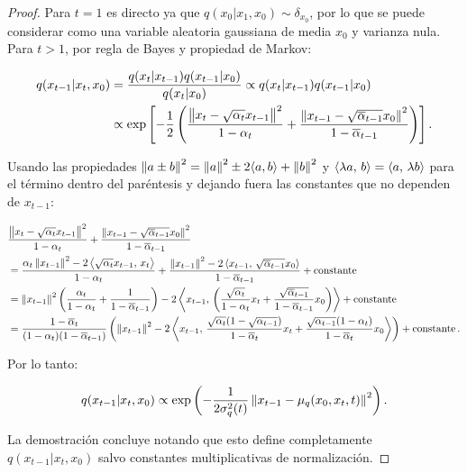 \begin{proof}

    Para $t=1$ es directo ya que $q(x_0|x_1,x_0)\sim\delta_{x_0}$, por lo que se puede considerar como una variable aleatoria gaussiana de media $x_0$ y varianza nula. Para $t>1$, por regla de Bayes y propiedad de Markov:

    \begin{align*}
        q(x_{t-1}|x_t,x_0) & = \frac{q(x_t|x_{t-1})q(x_{t-1}|x_0)}{q(x_t|x_0)}\propto q(x_t|x_{t-1})q(x_{t-1}|x_0)                                                                                                            \\
                           & \propto \exp\left[-\frac{1}{2}\left(\frac{\left\lVert x_t-\sqrt{\alpha_t}x_{t-1} \right\rVert^2}{1-\alpha_t} + \frac{\left\lVert x_{t-1}-\sqrt{\overline{\alpha}_{t-1}}x_0 \right\rVert^2}{1-\overline{\alpha}_{t-1}}\right)\right].
    \end{align*}

    Usando las propiedades $\left\lVert a\pm b \right\rVert^2=\left\lVert a \right\rVert^2\pm 2\langle a,b\rangle + \left\lVert b \right\rVert^2$ y $\left\langle \lambda a,\,b\right\rangle = \left\langle a,\,\lambda b\right\rangle$ para el término dentro del paréntesis y dejando fuera las constantes que no dependen de $x_{t-1}$:

    \begin{align*}
         & \frac{\left\lVert x_t-\sqrt{\alpha_t}x_{t-1} \right\rVert^2}{1-\alpha_t} + \frac{\left\lVert x_{t-1}-\sqrt{\overline{\alpha}_{t-1}}x_0 \right\rVert^2}{1-\overline{\alpha}_{t-1}}                                                                                                                              \\
         & = \frac{\alpha_t\left\lVert x_{t-1} \right\rVert^2-2\left\langle \sqrt{\alpha_t}x_{t-1},\,x_t\right\rangle}{1-\alpha_t} + \frac{\left\lVert x_{t-1} \right\rVert^2-2\left\langle x_{t-1},\,\sqrt{\overline{\alpha}_{t-1}} x_0\right\rangle}{1-\overline{\alpha}_{t-1}}+\operatorname{constante}                                                                \\
         & =\left\lVert x_{t-1} \right\rVert^2\left(\frac{\alpha_t}{1-\alpha_t}+\frac{1}{1-\overline{\alpha}_{t-1}}\right)-2\left\langle x_{t-1},\,\left(\frac{\sqrt{\alpha_t}}{1-\alpha_t}x_t + \frac{\sqrt{\overline{\alpha}_{t-1}}}{1-\overline{\alpha}_{t-1}}x_0\right)\right\rangle + \operatorname{constante}                               \\
         & =\frac{1-\overline{\alpha}_{t}}{(1-\alpha_t)(1-\overline{\alpha}_{t-1})}\left(\left\lVert x_{t-1} \right\rVert^2-2\left\langle x_{t-1},\,\frac{\sqrt{\alpha_t}(1-\sqrt{\alpha_{t-1}})}{1-\overline{\alpha}_t}x_t+\frac{\sqrt{\alpha_{t-1}}(1-\alpha_t)}{1-\overline{\alpha}_t}x_0\right\rangle\right) + \operatorname{constante} . \\
    \end{align*}

    Por lo tanto:

    \begin{equation*}
        q(x_{t-1}|x_t,x_0) \propto \exp\left(-\frac{1}{2\sigma_q^2(t)}\left\lVert x_{t-1}-\mu_q(x_0,x_t,t) \right\rVert^2\right).
    \end{equation*}

    La demostración concluye notando que esto define completamente $q(x_{t-1}|x_t,x_0)$ salvo constantes multiplicativas de normalización.
\end{proof}

